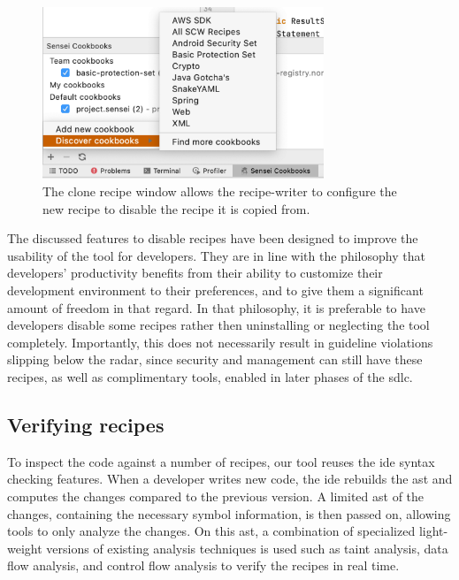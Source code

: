 \begin{figure}
  \centering
  \includegraphics[width=0.75\textwidth,page=2]{04-tools/figures/figures1.pdf}
  \caption[Clone recipe window]{The clone recipe window allows the recipe-writer to configure the new recipe to disable the recipe it is copied from.}
  \label{fig:clonewindow} 
\end{figure}

The discussed features to disable recipes have been designed to improve the usability of the tool for developers.
They are in line with the philosophy that developers' productivity benefits from their ability to customize their development environment to their preferences, and to give them a significant amount of freedom in that regard.
In that philosophy, it is preferable to have developers disable some recipes rather then uninstalling or neglecting the tool completely.
Importantly, this does not necessarily result in guideline violations slipping below the radar, since security and management can still have these recipes, as well as complimentary tools, enabled in later phases of the \gls{sdlc}.

\subsection{Verifying recipes}
To inspect the code against a number of recipes, our tool reuses the \gls{ide} syntax checking features.
When a developer writes new code, the \gls{ide} rebuilds the \gls{ast} and computes the changes compared to the previous version.
A limited \gls{ast} of the changes, containing the necessary symbol information, is then passed on, allowing tools to only analyze the changes.
On this \gls{ast}, a combination of specialized light-weight versions of existing analysis techniques is used such as taint analysis, data flow analysis, and control flow analysis to verify the recipes in real time.

